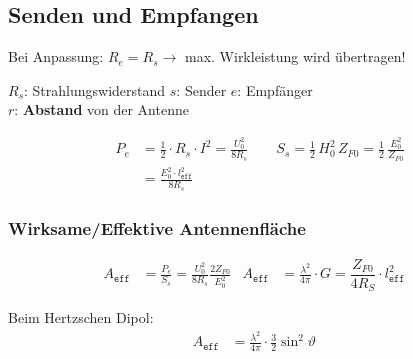 \subsection{Senden und Empfangen}
Bei Anpassung: $R_e = R_s \rightarrow$ max. Wirkleistung wird übertragen!


$ R_s $: Strahlungswiderstand \quad $ s $: Sender \qquad $ e $: Empfänger\\
$ r $: \textbf{Abstand} von der Antenne

\begin{align*}
	P_e & = \frac{1}{2}\cdot R_s \cdot I^2 = \frac{U_0^2}{8R_{s}} \qquad S_s = \frac{1}{2}\, H_0^2 \, Z_{F0} = \frac{1}{2} \, \frac{E_0^2}{Z_{F0}} \\
	    & = \frac{E_0^2\cdot l^2_{\mathtt{eff}}}{8R_{s}}
\end{align*}

\subsubsection{Wirksame/Effektive Antennenfläche}
\begin{align*}
	A_\texttt{eff} & = \frac{P_e}{S_s} = \frac{U_0^2}{8R_{s}}\frac{2Z_{F0}}{E_0^2}                  &
	A_\texttt{eff} & = \frac{\lambda^2}{4\pi}\cdot G = \dfrac{Z_{F0}}{4 R_S} \cdot l_\texttt{eff}^2 &
\end{align*}

Beim Hertzschen Dipol:
\begin{align*}
	A_\texttt{eff} & =  \frac{\lambda^2}{4\pi}\cdot\frac{3}{2}\sin^2\vartheta &
\end{align*}

